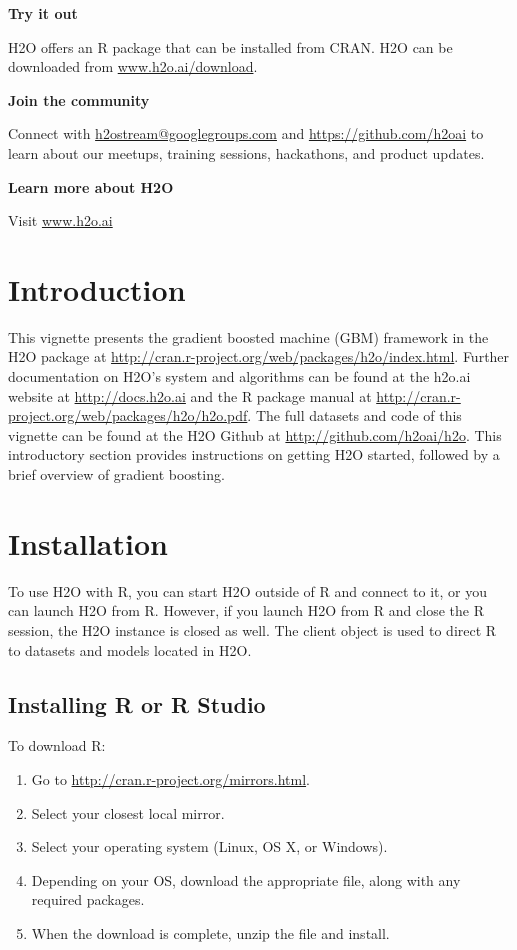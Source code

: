 \documentclass[11pt]{article}
\begin{document}
\textbf{Try it out}

H2O offers an R package that can be installed from CRAN. H2O can be downloaded from \url{www.h2o.ai/download}.

\textbf{Join the community}

Connect with \url{h2ostream@googlegroups.com} and \url{https://github.com/h2oai} to learn about our meetups, training sessions, hackathons, and product updates.

\textbf{Learn more about H2O}

Visit \url{www.h2o.ai}


\section{Introduction}

This vignette presents the gradient boosted machine (GBM) framework in the H2O package at {\url{http://cran.r-project.org/web/packages/h2o/index.html}}. Further documentation on H2O's system and algorithms can be found at the h2o.ai website at {\url{http://docs.h2o.ai}} and the R package manual at {\url{http://cran.r-project.org/web/packages/h2o/h2o.pdf}}. The full datasets and code of this vignette can be found at the H2O Github at {\url{http://github.com/h2oai/h2o}}. This introductory section provides instructions on getting H2O started, followed by a brief overview of gradient boosting.


\section{Installation}

To use H2O with R, you can start H2O outside of R and connect to it, or you can launch H2O from R. However, if you launch H2O from R and close the R session, the H2O instance is closed as well. The client object is used to direct R to datasets and models located in H2O.

\subsection{Installing R or R Studio}

To download R:
\begin{enumerate}
\item Go to \url{http://cran.r-project.org/mirrors.html}. 
\item Select your closest local mirror. 
\item Select your operating system (Linux, OS X, or Windows). 
\item Depending on your OS, download the appropriate file, along with any required packages. 
\item When the download is complete, unzip the file and install. \\
\end{enumerate}
\end{document}
